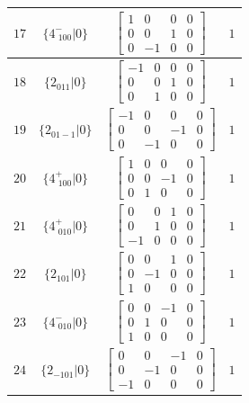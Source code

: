 \documentclass[fleqn,8pt]{jsarticle}
\begin{document}
\begin{longtable}{cccc}
$ 17 $ & $ \{4^{-}_{\,\,100}|0\} $ & $ \begin{bmatrix} 1 & 0 & 0 & 0 \\ 0 & 0 & 1 & 0 \\ 0 & -1 & 0 & 0 \end{bmatrix} $ & $ 1 $ \\ \hline
$ 18 $ & $ \{2{}_{011}|0\} $ & $ \begin{bmatrix} -1 & 0 & 0 & 0 \\ 0 & 0 & 1 & 0 \\ 0 & 1 & 0 & 0 \end{bmatrix} $ & $ 1 $ \\ \hline
$ 19 $ & $ \{2{}_{01-1}|0\} $ & $ \begin{bmatrix} -1 & 0 & 0 & 0 \\ 0 & 0 & -1 & 0 \\ 0 & -1 & 0 & 0 \end{bmatrix} $ & $ 1 $ \\ \hline
$ 20 $ & $ \{4^{+}_{\,\,100}|0\} $ & $ \begin{bmatrix} 1 & 0 & 0 & 0 \\ 0 & 0 & -1 & 0 \\ 0 & 1 & 0 & 0 \end{bmatrix} $ & $ 1 $ \\ \hline
$ 21 $ & $ \{4^{+}_{\,\,010}|0\} $ & $ \begin{bmatrix} 0 & 0 & 1 & 0 \\ 0 & 1 & 0 & 0 \\ -1 & 0 & 0 & 0 \end{bmatrix} $ & $ 1 $ \\ \hline
$ 22 $ & $ \{2{}_{101}|0\} $ & $ \begin{bmatrix} 0 & 0 & 1 & 0 \\ 0 & -1 & 0 & 0 \\ 1 & 0 & 0 & 0 \end{bmatrix} $ & $ 1 $ \\ \hline
$ 23 $ & $ \{4^{-}_{\,\,010}|0\} $ & $ \begin{bmatrix} 0 & 0 & -1 & 0 \\ 0 & 1 & 0 & 0 \\ 1 & 0 & 0 & 0 \end{bmatrix} $ & $ 1 $ \\ \hline
$ 24 $ & $ \{2{}_{-101}|0\} $ & $ \begin{bmatrix} 0 & 0 & -1 & 0 \\ 0 & -1 & 0 & 0 \\ -1 & 0 & 0 & 0 \end{bmatrix} $ & $ 1 $ \\ \hline

\end{longtable}
\end{document}
